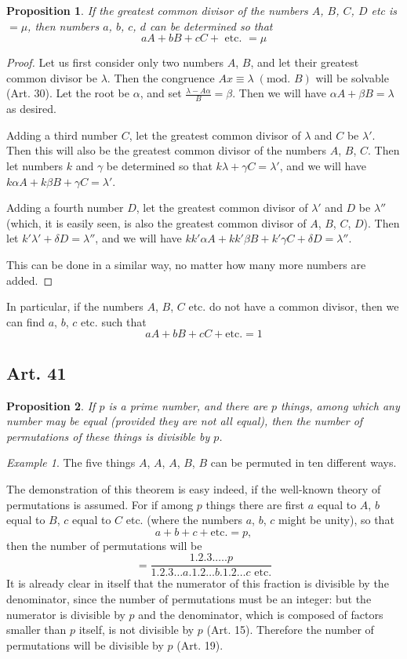 \documentclass{book}
\theoremstyle{plain}
\newtheorem{proposition}{Proposition}
\theoremstyle{remark}
\newtheorem*{example}{Example}
\begin{document}
\begin{proposition} If the greatest common divisor of the numbers $A$, $B$, $C$, $D$ etc is $=\mu$, then numbers $a$, $b$, $c$, $d$ can be determined so that 
\[ aA + bB + cC + \textrm{ etc. } = \mu \]
\end{proposition}
\begin{proof}  Let us first consider only two numbers $A$, $B$, and let their greatest common divisor be $\lambda$.  Then the congruence $Ax \equiv \lambda \;(\textrm{mod. }B)$ will be solvable (Art. 30).  Let the root be $\alpha$, and set $\frac{\lambda-A\alpha}{B} = \beta$. Then we will have $\alpha A + \beta B = \lambda$ as desired.

Adding a third number $C$, let the greatest common divisor of $\lambda$ and $C$ be $\lambda'$.  Then this will also be the greatest common divisor of the numbers $A$, $B$, $C$.   Then let numbers $k$ and $\gamma$ be determined so that $k \lambda + \gamma C = \lambda'$, and we will have $k\alpha A + k \beta B + \gamma C = \lambda'$. 

Adding a fourth number $D$, let the greatest common divisor of $\lambda'$ and $D$ be $\lambda''$ (which, it is easily seen, is also the greatest common divisor of $A$, $B$, $C$, $D$).  Then let $k' \lambda' + \delta D = \lambda''$, and we will have $kk'\alpha A + kk'\beta B + k'\gamma C + \delta D = \lambda''$. 

This can be done in a similar way, no matter how many more numbers are added. \end{proof}

In particular, if the numbers $A$, $B$, $C$ etc. do not have a common divisor, then we can find $a$, $b$, $c$ etc. such that 
\[ aA + bB + cC + \textrm{etc.} = 1 \]


\subsection*{Art. 41} 

\begin{proposition} If $p$ is a prime number, and there are $p$ things, among which any number may be equal (provided they are not all equal), then the number of permutations of these things is divisible by $p$. \end{proposition}
\begin{example} The five things $A$, $A$, $A$, $B$, $B$ can be permuted in ten different ways.  \end{example}
The demonstration of this theorem is easy indeed, if the well-known theory of permutations is assumed.  For if among $p$ things there are first $a$ equal to $A$, $b$ equal to $B$, $c$ equal to $C$ etc. (where the numbers $a$, $b$, $c$ might be unity), so that
\[ a + b + c + \mathrm{etc.} = p, \]
then the number of permutations will be 
\[ = \frac{1 .2.3.\dots.p}{1.2.3\dots a.1.2\dots b.1.2\dots c \textrm{ etc.}} \] 
It is already clear in itself that the numerator of this fraction is divisible by the denominator, since the number of permutations must be an integer: but the numerator is divisible by $p$ and the denominator, which is composed of factors smaller than $p$ itself, is not divisible by $p$ (Art. 15). Therefore the number of permutations will be divisible by $p$ (Art. 19).
\end{document}
